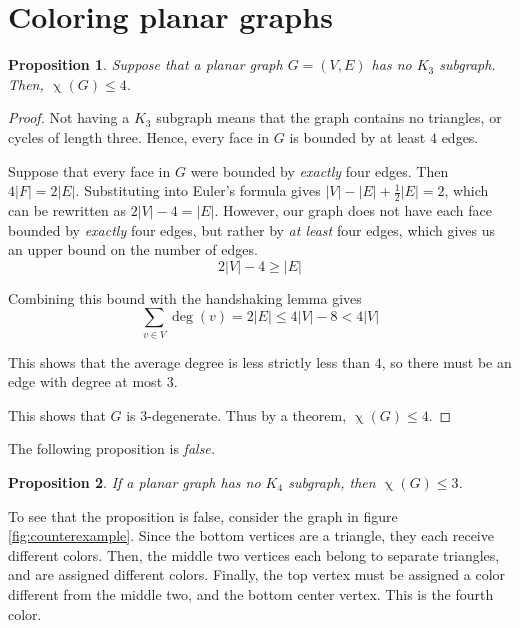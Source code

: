 \documentclass[12pt,letterpaper]{article}
\newcommand{\question}{\section}
\newtheorem{prop}{Proposition}
\DeclareMathOperator{\degOp}{deg}
\newcommand{\parens}[1]{\left(#1\right)}
\renewcommand{\deg}[1]{\degOp{\parens{#1}}}
\DeclareMathOperator{\chromOp}{\chi}
\newcommand{\chrom}[1]{\chromOp{\parens{#1}}}
\newcommand{\half}{\frac{1}{2}}
\begin{document}
\question{Coloring planar graphs}

\begin{prop}
    Suppose that a planar graph $G = (V, E)$ has no $K_3$ subgraph.
    Then, $\chrom{G} \leq 4$.
\end{prop}

\begin{proof}
    Not having a $K_3$ subgraph means that the graph contains no triangles, or
    cycles of length three. Hence, every face in $G$ is bounded by at least $4$
    edges.

    Suppose that every face in $G$ were bounded by \emph{exactly} four edges.
    Then $4|F| = 2|E|$.
    Substituting into Euler's formula gives $|V| - |E| + \half |E| = 2$, which
    can be rewritten as $2|V| - 4 = |E|$. However, our graph does not have each
    face bounded by \emph{exactly} four edges, but rather by \emph{at least}
    four edges, which gives us an upper bound on the number of edges.
    \begin{equation}
        \label{eq:edge-upper-bound}
        2|V| - 4 \geq |E|
    \end{equation}

    Combining this bound with the handshaking lemma gives
    \begin{equation}
        \label{eq:bounded-handshake}
        \sum_{v \in V} \deg{v} = 2 |E| \leq 4 |V| - 8 < 4 |V|
    \end{equation}

    This shows that the average degree is less strictly less than $4$, so there
    must be an edge with degree at most $3$.

    This shows that $G$ is $3$-degenerate.
    Thus by a theorem, $\chrom{G} \leq 4$.
\end{proof}

The following proposition is \emph{false.}

\begin{prop}
    If a planar graph has no $K_4$ subgraph, then $\chrom{G} \leq 3$.
\end{prop}

To see that the proposition is false, consider the graph in figure
\ref{fig:counterexample}. Since the bottom vertices are a triangle, they each
receive different colors. Then, the middle two vertices each belong to separate
triangles, and are assigned different colors. Finally, the top vertex must be
assigned a color different from the middle two, and the bottom center vertex.
This is the fourth color.
\end{document}
